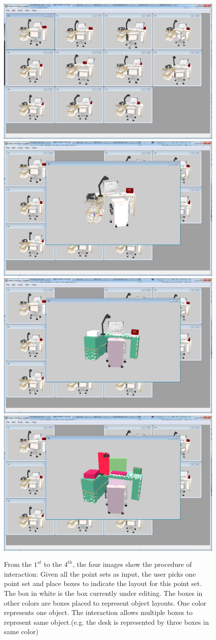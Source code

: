 \begin{figure}
	\centering
	\includegraphics[width=.45\linewidth]{images/interact01.png}
	\includegraphics[width=.45\linewidth]{images/interact02.png}
	\includegraphics[width=.45\linewidth]{images/interact03.png}
	\includegraphics[width=.45\linewidth]{images/interact06.png}
	\caption{\label{fig:interact}
		From the $1^{st}$ to the $4^{th}$, the four images show the procedure of interaction:
		Given all the point sets as input, the user picks one point set and place boxes to indicate the layout for this point set. The box in white is the box currently under editing. The boxes in other colors are boxes placed to represent object layouts. One color represents one object. The interaction allows multiple boxes to represent same object.(e.g. the desk is represented by three boxes in same color)}
\end{figure}


